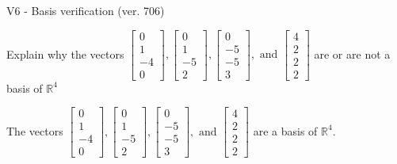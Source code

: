 \begin{exercise}
  \begin{exerciseTitle}V6 - Basis verification (ver. 706)\end{exerciseTitle}
  \begin{exerciseStatement}
    Explain why the vectors \(\left[\begin{array}{r}
0 \\
1 \\
-4 \\
0
\end{array}\right] , \left[\begin{array}{r}
0 \\
1 \\
-5 \\
2
\end{array}\right] , \left[\begin{array}{r}
0 \\
-5 \\
-5 \\
3
\end{array}\right] , \text{ and } \left[\begin{array}{r}
4 \\
2 \\
2 \\
2
\end{array}\right]\) are or are not a basis of \(\mathbb{R}^4\)	


  \end{exerciseStatement}
  \begin{exerciseAnswer}
   The vectors \(\left[\begin{array}{r}
0 \\
1 \\
-4 \\
0
\end{array}\right] , \left[\begin{array}{r}
0 \\
1 \\
-5 \\
2
\end{array}\right] , \left[\begin{array}{r}
0 \\
-5 \\
-5 \\
3
\end{array}\right] , \text{ and } \left[\begin{array}{r}
4 \\
2 \\
2 \\
2
\end{array}\right]\) 
  	 are  a basis of \(\mathbb{R}^4\).
  


  \end{exerciseAnswer}
\end{exercise}